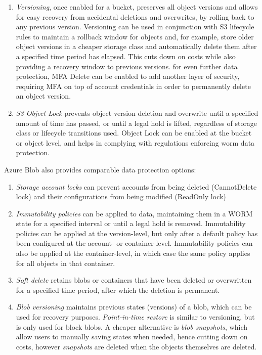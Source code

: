 \begin{enumerate}
    \item \textit{Versioning}, once enabled for a bucket, preserves all object versions and allows for easy recovery from accidental deletions and overwrites, by rolling back to any previous version. Versioning can be used in conjunction with S3 lifecycle rules to maintain a rollback window for objects and, for example, store older object versions in a cheaper storage class and automatically delete them after a specified time period has elapsed. This cuts down on costs while also providing a recovery window to previous versions. for even further data protection, MFA Delete can be enabled to add another layer of security, requiring MFA on top of account credentials in order to permanently delete an object version.

    \item \textit{S3 Object Lock} prevents object version deletion and overwrite until a specified amount of time has passed, or until a legal hold is lifted, regardless of storage class or lifecycle transitions used. Object Lock can be enabled at the bucket or object level, and helps in complying with regulations enforcing  \ac{worm} data protection.
\end{enumerate}


Azure Blob also provides comparable data protection options:~\cite{blob_data_protection}

\begin{enumerate}
    \item \textit{Storage account locks} can prevent accounts from being deleted (CannotDelete lock)  and their configurations from being modified (ReadOnly lock)

    \item \textit{Immutability policies} can be applied to data, maintaining them in a WORM state for a specified interval or until a legal hold is removed. Immutability policies can be applied at the version-level, but only after a default policy has been configured at the account- or container-level. Immutability policies can also be applied at the container-level, in which case the same policy applies for all objects in that container.

    \item \textit{Soft delete} retains blobs or containers that have been deleted or overwritten for a specified time period, after which the deletion is permanent.

    \item \textit{Blob versioning} maintains previous states (versions) of a blob, which can be used for recovery purposes.  \textit{Point-in-time restore} is similar to versioning, but is only used for block blobs. A cheaper alternative is \textit{blob snapshots}, which allow users to manually saving states when needed, hence cutting down on costs, however \textit{snapshots }are deleted when the objects themselves are deleted.
\end{enumerate}


